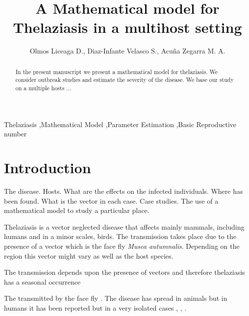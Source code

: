 \documentclass[preprint,12pt]{elsarticle}
\begin{document}
\begin{frontmatter}

\title{A Mathematical model for Thelaziasis in a multihost setting}

\author{Olmos Liceaga D., Diaz-Infante Velasco S., Acu\~na Zegarra M. A.}
\address{Universidad de Sonora}
\begin{abstract}
In the present manuscript we present a mathematical model for thelaziasis. We consider outbreak studies and estimate the severity of the disease. We base our study on a multiple hosts ...
\end{abstract}

\begin{keyword}
Thelaziasis \sep Mathematical Model \sep Parameter Estimation \sep Basic Reproductive number


\end{keyword}

\end{frontmatter}

\linenumbers

\section{Introduction}
\label{S:1}

\noindent The disease. Hosts. What are the effects on the infected individuals. Where has been found. What is the vector in each case. Case studies. The use of a mathematical model to study a particular place.

\noindent Thelaziasis is a vector neglected disease that affects mainly mammals, including humans and in a minor scales, birds. The transmission takes place due to the presence of a vector which is the face fly \textit{Musca autumnalis}. Depending on the region this vector might vary as well as the host species.

\noindent The transmission depends upon the presence of vectors and therefore thelaziasis has a seasonal occurrence \cite{Asrat:2016}

\noindent The transmitted by the face fly \cite{Otranto:2003}. The disease has spread in animals but in humans it has been reported but in a very isolated cases \cite{Wang:2014}, \cite{Otranto:2008}, \cite{shen:2006}.\\
\end{document}
